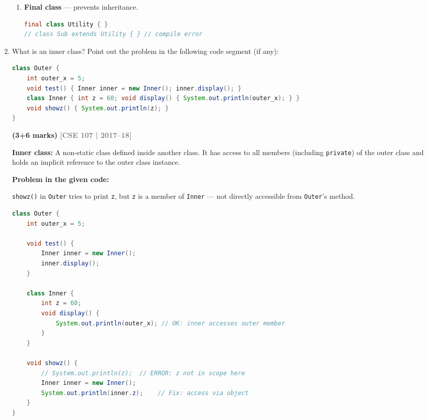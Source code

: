 \documentclass[12pt,a3paper]{article}
\newcommand{\yr}[1]{\hfill\textcolor{gray}{\small\textbf{[#1]}}}
\newcommand{\mk}[1]{\textcolor{orange!70!black}{\small\textbf{(#1 marks)}}}
\begin{document}
\begin{enumerate}
\begin{tcolorbox}
\begin{enumerate}[label=\textbf{\arabic*.}]
  \item \textbf{Final class} --- prevents inheritance.
\begin{lstlisting}[language=Java]
final class Utility { }
// class Sub extends Utility { } // compile error
\end{lstlisting}
\end{enumerate}

\end{tcolorbox}

\item What is an inner class? Point out the problem in the following code segment (if any):
\begin{lstlisting}[language=Java]
class Outer {
    int outer_x = 5;
    void test() { Inner inner = new Inner(); inner.display(); }
    class Inner { int z = 60; void display() { System.out.println(outer_x); } }
    void showz() { System.out.println(z); }
}
\end{lstlisting}
\mk{3+6}
\yr{CSE 107 | 2017--18}

\begin{tcolorbox}[enhanced,breakable,ansbox,
  colback=cD!4,colframe=cD,boxrule=0.8pt,arc=5pt,
  title={\textbf{Answer --- Inner Class \& Problem in \texttt{Outer}/\texttt{Inner} Code}},
  fonttitle=\bfseries\color{white},colbacktitle=cD]

\textbf{Inner class:} A non-static class defined inside another class.
It has access to all members (including \texttt{private}) of the outer
class and holds an implicit reference to the outer class instance.

\medskip
\textbf{Problem in the given code:}

\texttt{showz()} in \texttt{Outer} tries to print \texttt{z}, but
\texttt{z} is a member of \texttt{Inner} --- not directly accessible
from \texttt{Outer}'s method.

\begin{lstlisting}[language=Java]
class Outer {
    int outer_x = 5;

    void test() {
        Inner inner = new Inner();
        inner.display();
    }

    class Inner {
        int z = 60;
        void display() {
            System.out.println(outer_x); // OK: inner accesses outer member
        }
    }

    void showz() {
        // System.out.println(z);  // ERROR: z not in scope here
        Inner inner = new Inner();
        System.out.println(inner.z);    // Fix: access via object
    }
}
\end{lstlisting}


\end{tcolorbox}
\end{enumerate}
\end{document}
